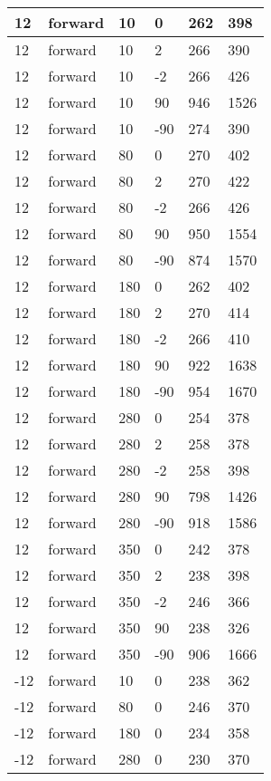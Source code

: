 \begin{table}
\begin{center}
\begin{tabular}{|l|l|l|l|l|l|}
			\hline
			12 & forward & 10 & 0 & 262 & 398 \\
			\hline
			12 & forward & 10 & 2 & 266 & 390 \\
			\hline
			12 & forward & 10 & -2 & 266 & 426 \\
			\hline
			12 & forward & 10 & 90 & 946 & 1526 \\
			\hline
			12 & forward & 10 & -90 & 274 & 390 \\
			\hline
			12 & forward & 80 & 0 & 270 & 402 \\
			\hline
			12 & forward & 80 & 2 & 270 & 422 \\
			\hline
			12 & forward & 80 & -2 & 266 & 426 \\
			\hline
			12 & forward & 80 & 90 & 950 & 1554 \\
			\hline
			12 & forward & 80 & -90 & 874 & 1570 \\
			\hline
			12 & forward & 180 & 0 & 262 & 402 \\
			\hline
			12 & forward & 180 & 2 & 270 & 414 \\
			\hline
			12 & forward & 180 & -2 & 266 & 410 \\
			\hline
			12 & forward & 180 & 90 & 922 & 1638 \\
			\hline
			12 & forward & 180 & -90 & 954 & 1670 \\
			\hline
			12 & forward & 280 & 0 & 254 & 378 \\
			\hline
			12 & forward & 280 & 2 & 258 & 378 \\
			\hline
			12 & forward & 280 & -2 & 258 & 398 \\
			\hline
			12 & forward & 280 & 90 & 798 & 1426 \\
			\hline
			12 & forward & 280 & -90 & 918 & 1586 \\
			\hline
			12 & forward & 350 & 0 & 242 & 378 \\
			\hline
			12 & forward & 350 & 2 & 238 & 398 \\
			\hline
			12 & forward & 350 & -2 & 246 & 366 \\
			\hline
			12 & forward & 350 & 90 & 238 & 326 \\
			\hline
			12 & forward & 350 & -90 & 906 & 1666 \\
			\hline
			-12 & forward & 10 & 0 & 238 & 362 \\
			\hline
			-12 & forward & 80 & 0 & 246 & 370 \\
			\hline
			-12 & forward & 180 & 0 & 234 & 358 \\
			\hline
			-12 & forward & 280 & 0 & 230 & 370 \\

\end{tabular}
\end{center}
\end{table}
